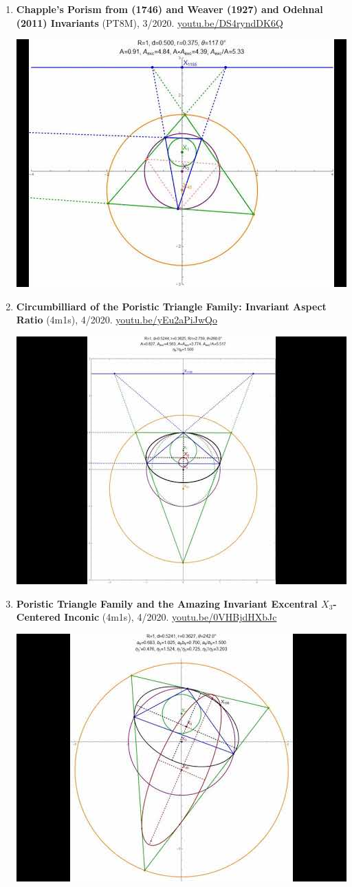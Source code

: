 \documentclass[12pt]{article}
\begin{document}
\begin{enumerate}[resume]
\item \textbf{Chapple's Porism from (1746) and Weaver (1927) and Odehnal (2011) Invariants} (PT8M), 3/2020. \href{https://youtu.be/DS4ryndDK6Q}{\url{youtu.be/DS4ryndDK6Q}}
\begin{center}\includegraphics[width=.5\textwidth]{pics/DS4ryndDK6Q.jpg}\end{center}
% 
\item \textbf{Circumbilliard of the Poristic Triangle Family: Invariant Aspect Ratio} (4m1s), 4/2020. \href{https://youtu.be/yEu2aPiJwQo}{\url{youtu.be/yEu2aPiJwQo}}
\begin{center}\includegraphics[width=.5\textwidth]{pics/yEu2aPiJwQo.jpg}\end{center}
% 
\item \textbf{Poristic Triangle Family and the Amazing Invariant Excentral $X_{3}$-Centered Inconic} (4m1s), 4/2020. \href{https://youtu.be/0VHBjdHXbJc}{\url{youtu.be/0VHBjdHXbJc}}
\begin{center}\includegraphics[width=.5\textwidth]{pics/0VHBjdHXbJc.jpg}\end{center}

\end{enumerate}
\end{document}
